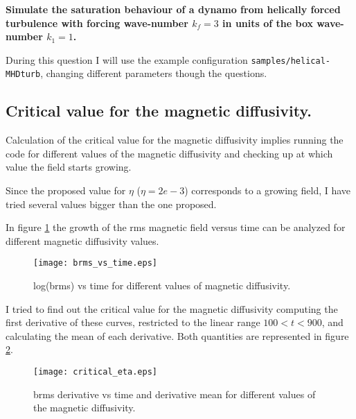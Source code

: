 
\textbf{Simulate the saturation behaviour of a dynamo from helically forced turbulence with forcing wave-number $k_f = 3$ in units of the box wave-number $k_1 = 1$.}

During  this question I will use the example configuration \texttt{samples/helical-MHDturb}, changing different parameters though the questions.

\subsection{Critical value for the magnetic diffusivity.}

Calculation of the critical value for the magnetic diffusivity implies running the code for different values of the magnetic diffusivity and checking up at which value the field starts growing.

Since the proposed value for $\eta$ ($\eta = 2e-3$) corresponds to a growing field, I have tried several values bigger than the one proposed.

In figure \ref{fig:brmst} the growth of the rms magnetic field versus time can be analyzed for different magnetic diffusivity values.

\begin{figure}[h]
\centering
\texttt{[image: brms\_vs\_time.eps]}
\caption{log(brms) vs time for different values of  magnetic diffusivity.}
\label{fig:brmst}
 \end{figure}


I tried to find out the critical value for the magnetic diffusivity computing the first derivative of these  curves, restricted to the linear range $100 < t < 900$, and calculating the mean of each derivative. Both quantities are represented in figure \ref{fig:crit_eta}.
\begin{figure}[h]
\centering
\texttt{[image: critical\_eta.eps]}
\caption{brms derivative vs time and derivative mean for different values of the magnetic diffusivity.}
\label{fig:crit_eta}
 \end{figure}

